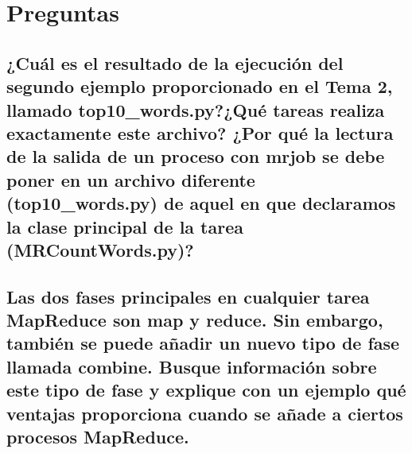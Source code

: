 \documentclass[12pt,a4paper,twoside,openright,titlepage,final]{article}
\author{José Ignacio Escribano}
\title{}
\begin{document}
\setcounter{page}{1}


\tableofcontents
\thispagestyle{empty}
\newpage

\setcounter{page}{1}


\section{Preguntas}

\subsection{¿Cuál es el resultado de la ejecución del segundo ejemplo proporcionado en el Tema 2, llamado top10\_words.py?¿Qué tareas realiza exactamente este archivo? ¿Por qué la lectura de la salida de un proceso con mrjob se debe poner en un archivo diferente (top10\_words.py) de aquel en que declaramos la clase principal de la tarea (MRCountWords.py)?}



\subsection{Las dos fases principales en cualquier tarea MapReduce son map y reduce. Sin embargo, también se puede añadir un nuevo tipo de fase llamada combine. Busque información sobre este tipo de fase y explique con un ejemplo qué ventajas proporciona cuando se añade a ciertos procesos MapReduce.}
\end{document}
